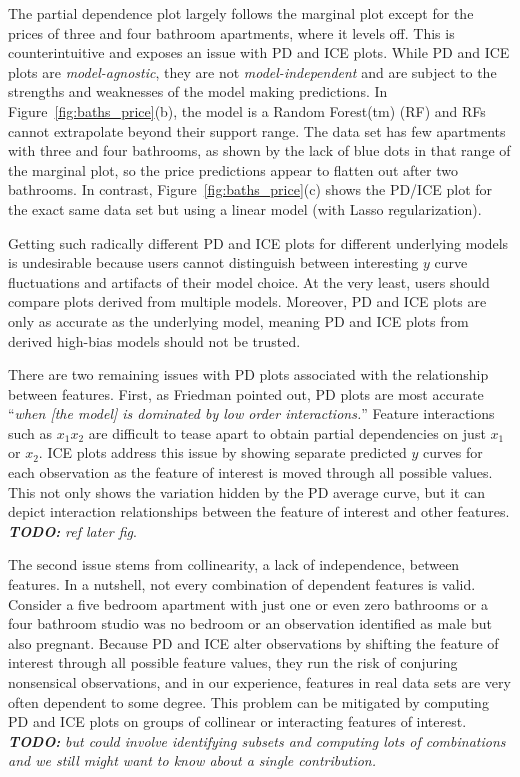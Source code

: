 \documentclass[12pt]{article}
\newcommand{\figref}[1]{Figure~\ref{#1}}
\newcommand{\todo}[1]{{\bf\em TODO:} {\em #1}}
\begin{document}
The partial dependence plot largely follows the marginal plot except for the prices of three and four bathroom apartments, where it levels off. This is counterintuitive and exposes an issue with PD and ICE plots. While PD and ICE plots are {\em model-agnostic}, they are not {\em model-independent} and are subject to the strengths and weaknesses of the model making predictions. In \figref{fig:baths_price}(b), the model is a Random Forest(tm) (RF) and RFs cannot extrapolate beyond their support range.  The data set has few apartments with three and four bathrooms, as shown by the lack of blue dots in that range of the marginal plot, so the price predictions appear to flatten out after two bathrooms.  In contrast, \figref{fig:baths_price}(c) shows the PD/ICE plot for the exact same data set but using a linear model (with Lasso regularization).

Getting such radically different PD and ICE plots for different underlying models is undesirable because users cannot distinguish between interesting $y$ curve fluctuations and artifacts of their model choice. At the very least, users should compare plots derived from multiple models. Moreover, PD and ICE plots are only as accurate as the underlying model, meaning PD and ICE plots from derived high-bias models should not be trusted.

There are two remaining issues with PD plots associated with the relationship between features. First, as Friedman pointed out, PD plots are most accurate ``{\em when {\em [the model]} is dominated by low order interactions.}''  Feature interactions such as $x_1x_2$ are difficult to tease apart to obtain partial dependencies on just $x_1$ or $x_2$. ICE plots address this issue by showing separate predicted $y$ curves for each observation as the feature of interest is moved through all possible values.  This not only shows the variation hidden by the PD average curve, but it can depict interaction relationships between the feature of interest and other features. \todo{ref later fig}.

The second issue stems from collinearity, a lack of independence, between features.  In a nutshell, not every combination of dependent features is valid. Consider a five bedroom apartment with just one or even zero bathrooms or a four bathroom studio was no bedroom or an observation identified as male but also pregnant.  Because PD and ICE alter observations by shifting the feature of interest through all possible feature values, they run the risk of conjuring nonsensical observations, and in our experience, features in real data sets are very often dependent to some degree. This problem can be mitigated by computing PD and ICE plots on groups of collinear or interacting features of interest. \todo{but could involve identifying subsets and computing lots of combinations and we still might want to know about a single contribution.}
\end{document}
